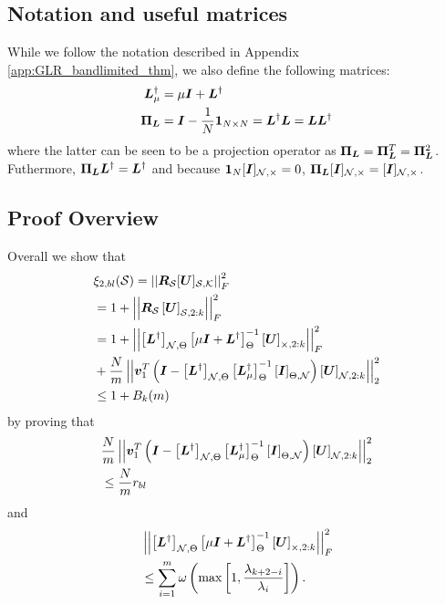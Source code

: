 \subsection{Notation and useful matrices}
While we follow the notation described in Appendix \ref{app:GLR_bandlimited_thm}, we also define the following matrices:
\begin{align}
     \matr{L}^{\dagger}_{\mu} &= \mu\matr{I} + \matr{L}^{\dagger} \\
     \projgen{\matr{L}} &= \matr{I} - \frac{1}{N}\vect{1}_{N \times N} = \matr{L}^{\dagger}\matr{L} = \matr{L}\matr{L}^{\dagger}
\end{align}
where the latter can be seen to be a projection operator as $ \projgen{\matr{L}} = \projgen{\matr{L}}^{T} = \projgen{\matr{L}}^{2}$. Futhermore, $\projgen{\matr{L}}\matr{L}^{\dagger} = \matr{L}^{\dagger}$ and because $\vect{1}_{N}\matrsub[N,\Theta]{I} = 0$, $\projgen{\matr{L}}\matrsub[N,\Theta]{I} = \matrsub[N,\Theta]{I}$.

\subsection{Proof Overview}
Overall we show that 
\begin{align}
    &\xi_{2,bl}(\set{S}) = \sqfrob{\matr{R}_{\set{S}}\matrsubU{S}} \\
    &= 1 + \sqfrob{\matr{R}_{\set{S}}\msubgen[\set{S},2:k]{\matr{U}}} \\
    &= 1 + \sqfrob{\msubgen[\set{N},\Theta]{\matr{L}^{\dagger}} \msubgen[\Theta]{\mu\matr{I} + \matr{L}^{\dagger}}^{-1}\msubgen[\set{\Theta},2:k]{\matr{U}} } \\
    &+ {\frac{N}{m}}\sqnormvec{\vect{v}_{1}^{T}\left( \matr{I} - \msubgen[\set{N},\Theta]{\matr{L}^{\dagger}} \msubgen[\Theta]{ \matr{L}_{\mu}^{\dagger}}^{-1}\msubgen[\Theta,\set{N}]{\matr{I}}\right)\msubgen[\set{N},2:k]{\matr{U}}} \\
    &\leq  1 + B_{k}(m)
\end{align}
by proving that
\begin{align}
    &{\frac{N}{m}}\sqnormvec{\vect{v}_{1}^{T}\left( \matr{I} - \msubgen[\set{N},\Theta]{\matr{L}^{\dagger}} \msubgen[\Theta]{ \matr{L}_{\mu}^{\dagger}}^{-1}\msubgen[\Theta,\set{N}]{\matr{I}}\right)\msubgen[\set{N},2:k]{\matr{U}}} \\
    &\leq \frac{N}{m}r_{bl}
\end{align}
and
\begin{align}
   &\sqfrob{\msubgen[\set{N},\Theta]{\matr{L}^{\dagger}} \msubgen[\Theta]{\mu\matr{I} + \matr{L}^{\dagger}}^{-1}\msubgen[\set{\Theta},2:k]{\matr{U}} }  \\
   &\leq \sum^{m}_{i=1}\omega\left(\max\left[1,\frac{\lambda_{k+2-i}}{\lambda_{i}}\right]\right).
\end{align}

